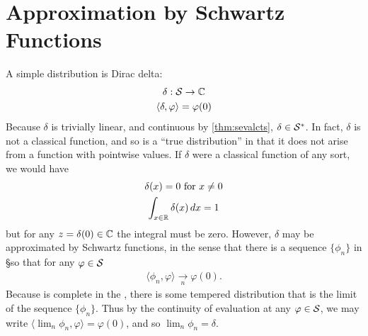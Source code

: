   \section{Approximation by Schwartz Functions}
    A simple distribution is Dirac delta:
    \begin{gather*}
      \delta:\S\rightarrow\C\\
      \langle\delta,\varphi\rangle = \varphi(0)
    \end{gather*}
    Because $\delta$ is trivially linear, and continuous by \cref{thm:sevalcts}, $\delta\in\SS$.
    In fact, $\delta$ is not a classical function, and so is a ``true distribution'' in that it does not arise from a function with pointwise values.
    If $\delta$ were a classical function of any sort, we would have
    \begin{gather*}
      \delta(x)=0\text{ for }x\ne0\\
      \int_{x\in\R} \delta(x)\,dx = 1
    \end{gather*}
    but for any $z=\delta(0)\in\C$ the integral must be zero.
    However, $\delta$ may be approximated by Schwartz functions, in the sense that there is a sequence $\{\phi_n\}$ in \S so that for any $\varphi\in\S$
    \begin{align*}
      \langle \phi_n, \varphi\rangle \underset{n}{\longrightarrow} \varphi(0)\text{.}
    \end{align*}
    Because \SS is complete in the \ws {}, there is some tempered distribution that is the limit of the sequence $\{\phi_n\}$.
    Thus by the continuity of evaluation at any $\varphi\in\S$, we may write $\langle\lim_n\phi_n,\varphi\rangle=\varphi(0)$, and so $\lim_n\phi_n=\delta$.

